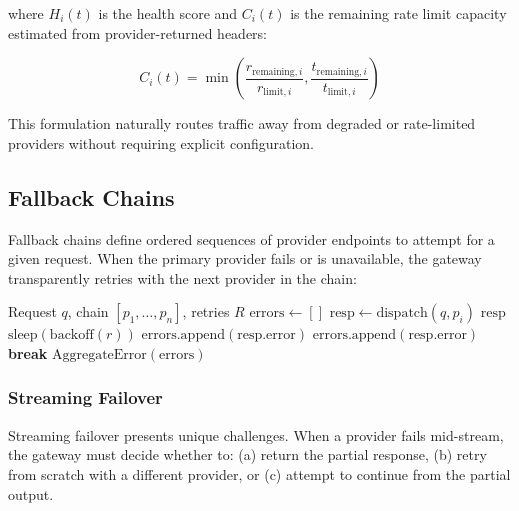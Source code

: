 \documentclass[11pt,twocolumn]{article}
\begin{document}
where $H_i(t)$ is the health score and $C_i(t)$ is the remaining rate limit capacity estimated from provider-returned headers:

\begin{equation}
C_i(t) = \min\left(\frac{r_{\text{remaining},i}}{r_{\text{limit},i}}, \frac{t_{\text{remaining},i}}{t_{\text{limit},i}}\right)
\end{equation}

This formulation naturally routes traffic away from degraded or rate-limited providers without requiring explicit configuration.

\subsection{Fallback Chains}

Fallback chains define ordered sequences of provider endpoints to attempt for a given request. When the primary provider fails or is unavailable, the gateway transparently retries with the next provider in the chain:

\begin{algorithm}[t]
\caption{Fallback Chain Execution}
\label{alg:fallback}
\begin{algorithmic}[1]
\REQUIRE Request $q$, chain $[p_1, \ldots, p_n]$, retries $R$
\STATE $\text{errors} \gets []$
        \STATE $\text{resp} \gets \text{dispatch}(q, p_i)$
            \RETURN $\text{resp}$
            \STATE $\text{sleep}(\text{backoff}(r))$
            \STATE $\text{errors.append}(\text{resp.error})$
        \ELSE
            \STATE $\text{errors.append}(\text{resp.error})$
            \STATE \textbf{break} 
        \ENDIF
    \ENDFOR
\ENDFOR
\RETURN $\text{AggregateError}(\text{errors})$
\end{algorithmic}
\end{algorithm}

\subsubsection{Streaming Failover}

Streaming failover presents unique challenges. When a provider fails mid-stream, the gateway must decide whether to: (a) return the partial response, (b) retry from scratch with a different provider, or (c) attempt to continue from the partial output.
\end{document}
